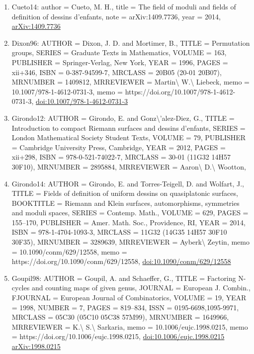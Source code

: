 \documentclass[11pt]{article}
\begin{document}
\begin{enumerate}[leftmargin=*]
  \item Cueto14: author = Cueto, M. H., title = The field of moduli and fields of definition of dessins d'enfants, note = arXiv:1409.7736, year = 2014, \href{https://arxiv.org/abs/1409.7736}{arXiv:1409.7736}
  \item Dixon96: AUTHOR = Dixon, J. D. and Mortimer, B., TITLE = Permutation groups, SERIES = Graduate Texts in Mathematics, VOLUME = 163, PUBLISHER = Springer-Verlag, New York, YEAR = 1996, PAGES = xii+346, ISBN = 0-387-94599-7, MRCLASS = 20B05 (20-01 20B07), MRNUMBER = 1409812, MRREVIEWER = Martin\textbackslash{} W.\textbackslash{} Liebeck, memo = 10.1007/978-1-4612-0731-3, memo = https://doi.org/10.1007/978-1-4612-0731-3, \href{https://doi.org/10.1007/978-1-4612-0731-3}{doi:10.1007/978-1-4612-0731-3}
  \item Girondo12: AUTHOR = Girondo, E. and Gonz\textbackslash{}'alez-Diez, G., TITLE = Introduction to compact Riemann surfaces and dessins d'enfants, SERIES = London Mathematical Society Student Texts, VOLUME = 79, PUBLISHER = Cambridge University Press, Cambridge, YEAR = 2012, PAGES = xii+298, ISBN = 978-0-521-74022-7, MRCLASS = 30-01 (11G32 14H57 30F10), MRNUMBER = 2895884, MRREVIEWER = Aaron\textbackslash{} D.\textbackslash{} Wootton,
  \item Girondo14: AUTHOR = Girondo, E. and Torres-Teigell, D. and Wolfart, J., TITLE = Fields of definition of uniform dessins on quasiplatonic surfaces, BOOKTITLE = Riemann and Klein surfaces, automorphisms, symmetries and moduli spaces, SERIES = Contemp. Math., VOLUME = 629, PAGES = 155--170, PUBLISHER = Amer. Math. Soc., Providence, RI, YEAR = 2014, ISBN = 978-1-4704-1093-3, MRCLASS = 11G32 (14G35 14H57 30F10 30F35), MRNUMBER = 3289639, MRREVIEWER = Ayberk\textbackslash{} Zeytin, memo = 10.1090/conm/629/12558, memo = https://doi.org/10.1090/conm/629/12558, \href{https://doi.org/10.1090/conm/629/12558}{doi:10.1090/conm/629/12558}
  \item Goupil98: AUTHOR = Goupil, A. and Schaeffer, G., TITLE = Factoring N-cycles and counting maps of given genus, JOURNAL = European J. Combin., FJOURNAL = European Journal of Combinatorics, VOLUME = 19, YEAR = 1998, NUMBER = 7, PAGES = 819--834, ISSN = 0195-6698,1095-9971, MRCLASS = 05C30 (05C10 05C38 57M99), MRNUMBER = 1649966, MRREVIEWER = K.\textbackslash{} S.\textbackslash{} Sarkaria, memo = 10.1006/eujc.1998.0215, memo = https://doi.org/10.1006/eujc.1998.0215, \href{https://doi.org/10.1006/eujc.1998.0215}{doi:10.1006/eujc.1998.0215} \href{https://arxiv.org/abs/1998.0215}{arXiv:1998.0215}

\end{enumerate}
\end{document}
